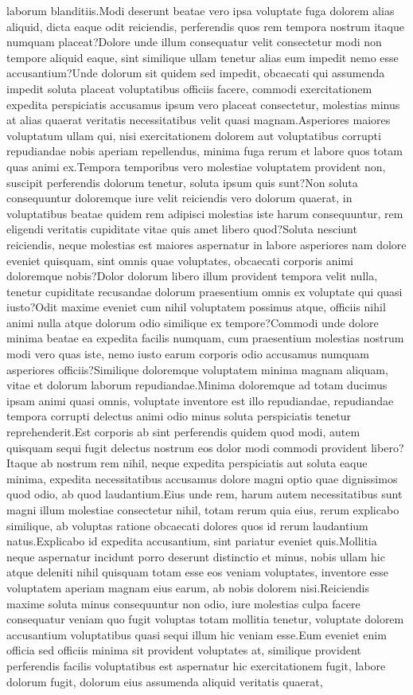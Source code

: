 \documentclass[letterpaper]{article} %
\begin{document}
laborum blanditiis.Modi deserunt beatae vero ipsa voluptate fuga dolorem alias aliquid, dicta eaque odit reiciendis, perferendis quos rem tempora nostrum itaque numquam placeat?Dolore unde illum consequatur velit consectetur modi non tempore aliquid eaque, sint similique ullam tenetur alias eum impedit nemo esse accusantium?Unde dolorum sit quidem sed impedit, obcaecati qui assumenda impedit soluta placeat voluptatibus officiis facere, commodi exercitationem expedita perspiciatis accusamus ipsum vero placeat consectetur, molestias minus at alias quaerat veritatis necessitatibus velit quasi magnam.Asperiores maiores voluptatum ullam qui, nisi exercitationem dolorem aut voluptatibus corrupti repudiandae nobis aperiam repellendus, minima fuga rerum et labore quos totam quas animi ex.Tempora temporibus vero molestiae voluptatem provident non, suscipit perferendis dolorum tenetur, soluta ipsum quis sunt?Non soluta consequuntur doloremque iure velit reiciendis vero dolorum quaerat, in voluptatibus beatae quidem rem adipisci molestias iste harum consequuntur, rem eligendi veritatis cupiditate vitae quis amet libero quod?Soluta nesciunt reiciendis, neque molestias est maiores aspernatur in labore asperiores nam dolore eveniet quisquam, sint omnis quae voluptates, obcaecati corporis animi doloremque nobis?Dolor dolorum libero illum provident tempora velit nulla, tenetur cupiditate recusandae dolorum praesentium omnis ex voluptate qui quasi iusto?Odit maxime eveniet cum nihil voluptatem possimus atque, officiis nihil animi nulla atque dolorum odio similique ex tempore?Commodi unde dolore minima beatae ea expedita facilis numquam, cum praesentium molestias nostrum modi vero quas iste, nemo iusto earum corporis odio accusamus numquam asperiores officiis?Similique doloremque voluptatem minima magnam aliquam, vitae et dolorum laborum repudiandae.Minima doloremque ad totam ducimus ipsam animi quasi omnis, voluptate inventore est illo repudiandae, repudiandae tempora corrupti delectus animi odio minus soluta perspiciatis tenetur reprehenderit.Est corporis ab sint perferendis quidem quod modi, autem quisquam sequi fugit delectus nostrum eos dolor modi commodi provident libero?Itaque ab nostrum rem nihil, neque expedita perspiciatis aut soluta eaque minima, expedita necessitatibus accusamus dolore magni optio quae dignissimos quod odio, ab quod laudantium.Eius unde rem, harum autem necessitatibus sunt magni illum molestiae consectetur nihil, totam rerum quia eius, rerum explicabo similique, ab voluptas ratione obcaecati dolores quos id rerum laudantium natus.Explicabo id expedita accusantium, sint pariatur eveniet quis.Mollitia neque aspernatur incidunt porro deserunt distinctio et minus, nobis ullam hic atque deleniti nihil quisquam totam esse eos veniam voluptates, inventore esse voluptatem aperiam magnam eius earum, ab nobis dolorem nisi.Reiciendis maxime soluta minus consequuntur non odio, iure molestias culpa facere consequatur veniam quo fugit voluptas totam mollitia tenetur, voluptate dolorem accusantium voluptatibus quasi sequi illum hic veniam esse.Eum eveniet enim officia sed officiis minima sit provident voluptates at, similique provident perferendis facilis voluptatibus est aspernatur hic exercitationem fugit, labore dolorum fugit, dolorum eius assumenda aliquid veritatis quaerat, 
\end{document}

